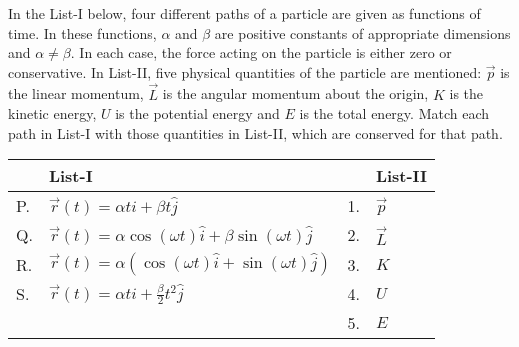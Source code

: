 
    \item In the List-I below, four different paths of a particle are given as functions of time. In these functions, $\alpha$ and $\beta$ are positive constants of appropriate dimensions and $\alpha \neq \beta$. In each case, the force acting on the particle is either zero or conservative. In List-II, five physical quantities of the particle are mentioned: $\vec{p}$ is the linear momentum, $\vec{L}$ is the angular momentum about the origin, $K$ is the kinetic energy, $U$ is the potential energy and $E$ is the total energy. Match each path in List-I with those quantities in List-II, which are conserved for that path.

\begin{center}
    \renewcommand{\arraystretch}{2}
    \begin{table}[h]
        \centering
        \begin{tabular}{p{0.25cm}p{8cm}|p{0.25cm}p{5cm}}
        \hline
        & List-I & &List-II \\
        \hline
        P. & $\vec{r}(t) = \alpha t \hat{i} + \beta t \hat{j}$ & 1. & $\vec{p}$ \\
        Q. & $\vec{r}(t) = \alpha \cos(\omega t) \hat{i} + \beta \sin(\omega t) \hat{j}$ & 2. & $\vec{L}$ \\
        R. & $\vec{r}(t) = \alpha (\cos(\omega t) \hat{i} + \sin(\omega t) \hat{j})$ & 3. & $K$ \\
        S. & $\vec{r}(t) = \alpha t \hat{i} + \frac{\beta}{2} t^{2} \hat{j}$ & 4. & $U$ \\
        & & 5. & $E$ \\
        \hline
        \end{tabular}
    \end{table}
\end{center}

